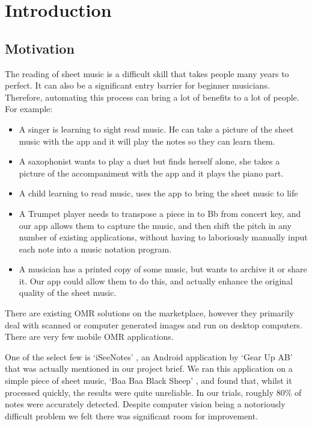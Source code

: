 \section{Introduction}
\subsection{Motivation}
 
The reading of sheet music is a difficult skill that takes people many years to perfect. It can also be a significant entry barrier for beginner musicians. Therefore, automating this process can bring a lot of benefits to a lot of people. For example:

\begin{itemize}
  \item A singer is learning to sight read music. He can take a picture of the sheet music with the app and it will play the notes so they can learn them.
  \item A saxophonist wants to play a duet but finds herself alone, she takes a picture of the accompaniment with the app and it plays the piano part.
  \item A child learning to read music, uses the app to bring the sheet music to life
  \item A Trumpet player needs to transpose a piece in to Bb from concert key, and our app allows them to capture the music, and then shift the pitch in any number of existing applications, without having to laboriously manually input each note into a music notation program.
  \item A musician has a printed copy of some music, but wants to archive it or share it. Our app could allow them to do this, and actually enhance the original quality of the sheet music.
\end{itemize}

There are existing OMR solutions on the marketplace, however they primarily deal with scanned or computer generated images and run on desktop computers. There are very few mobile OMR applications.

One of the select few is \lq iSeeNotes' , an Android application by \lq Gear Up AB'   that was actually mentioned in our project brief. We ran this application on a simple piece of sheet music, \lq Baa Baa Black Sheep' , and found that, whilst it processed quickly, the results were quite unreliable. In our trials, roughly 80\% of notes were accurately detected. Despite computer vision being a notoriously difficult problem we felt there was significant room for improvement.

